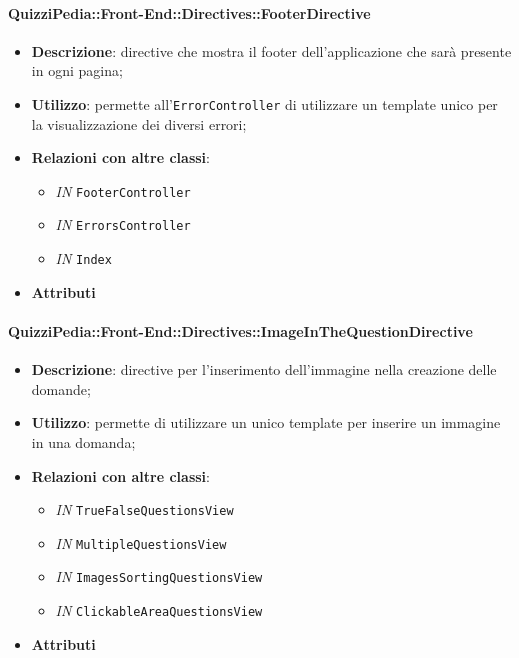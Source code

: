 \paragraph{QuizziPedia::Front-End::Directives::FooterDirective}
\begin{itemize}
	\item \textbf{Descrizione}: directive che mostra il footer dell'applicazione che sarà presente in ogni pagina;
	\item \textbf{Utilizzo}: permette all'\texttt{ErrorController} di utilizzare un template unico per la visualizzazione dei diversi errori;
	\item \textbf{Relazioni con altre classi}:
	\begin{itemize}
		\item \textit{IN} \texttt{FooterController}
		\item \textit{IN} \texttt{ErrorsController}
		\item \textit{IN} \texttt{Index}
	\end{itemize}
	\item \textbf{Attributi}
\end{itemize}

\paragraph{QuizziPedia::Front-End::Directives::ImageInTheQuestionDirective}
\begin{itemize}
	\item \textbf{Descrizione}: directive per l'inserimento dell'immagine nella creazione delle domande;
	\item \textbf{Utilizzo}: permette di utilizzare un unico template per inserire un immagine in una domanda;
	\item \textbf{Relazioni con altre classi}:
	\begin{itemize}
		\item \textit{IN} \texttt{TrueFalseQuestionsView} \\
		\item \textit{IN} \texttt{MultipleQuestionsView} \\
		\item \textit{IN} \texttt{ImagesSortingQuestionsView} \\
		\item \textit{IN} \texttt{ClickableAreaQuestionsView} \\
	\end{itemize}
	\item \textbf{Attributi}
\end{itemize}